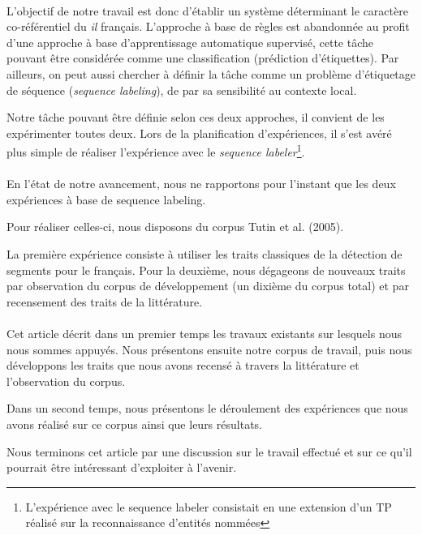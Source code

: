 \documentclass[a4paper,12pt]{article}
\begin{document}
\paragraph{}
L'objectif de notre travail est donc d'établir un système déterminant le caractère co-référentiel du \og{}\textit{il}\fg{} français. L'approche à base de règles est abandonnée au profit d'une approche à base d'apprentissage automatique supervisé, cette tâche pouvant être considérée comme une classification (prédiction d'étiquettes). Par ailleurs, on peut aussi chercher à définir la tâche comme un problème d'étiquetage de séquence (\emph{sequence labeling}), de par sa sensibilité au contexte local.

Notre tâche pouvant être définie selon ces deux approches, il convient de les expérimenter toutes deux. Lors de la planification d'expériences, il s'est avéré plus simple de réaliser l'expérience avec le \emph{sequence labeler}\footnote{\samepage L'expérience avec le sequence labeler consistait en une extension d'un TP réalisé sur la reconnaissance d'entités nommées}.

\paragraph{}
En l'état de notre avancement, nous ne rapportons pour l'instant que les deux expériences à base de sequence labeling.

Pour réaliser celles-ci, nous disposons du corpus Tutin et al.\cite{tutin:hal-00373327} (2005). 

La première expérience consiste à utiliser les traits classiques de la détection de segments pour le français. Pour la deuxième, nous dégageons de nouveaux traits par observation du corpus de développement (un dixième du corpus total) et par recensement des traits de la littérature.

\paragraph{}
Cet article décrit dans un premier temps les travaux existants sur lesquels nous nous sommes appuyés. Nous présentons ensuite notre corpus de travail, puis nous développons les traits que nous avons recensé à travers la littérature et l'observation du corpus.

Dans un second temps, nous présentons le déroulement des expériences que nous avons réalisé sur ce corpus ainsi que leurs résultats.

Nous terminons cet article par une discussion sur le travail effectué et sur ce qu'il pourrait être intéressant d'exploiter à l'avenir.
\end{document}
